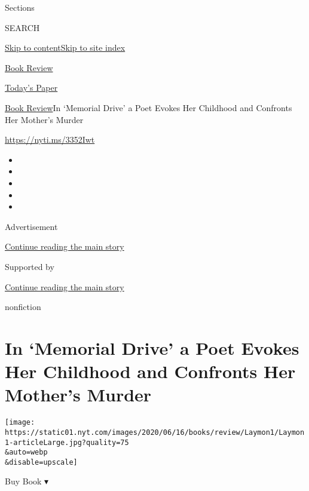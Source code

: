 Sections

SEARCH

\protect\hyperlink{site-content}{Skip to
content}\protect\hyperlink{site-index}{Skip to site index}

\href{https://www.nytimes.com/section/books/review}{Book Review}

\href{https://myaccount.nytimes.com/auth/login?response_type=cookie\&client_id=vi}{}

\href{https://www.nytimes.com/section/todayspaper}{Today's Paper}

\href{/section/books/review}{Book Review}\textbar{}In `Memorial Drive' a
Poet Evokes Her Childhood and Confronts Her Mother's Murder

\url{https://nyti.ms/3352Iwt}

\begin{itemize}
\item
\item
\item
\item
\item
\end{itemize}

Advertisement

\protect\hyperlink{after-top}{Continue reading the main story}

Supported by

\protect\hyperlink{after-sponsor}{Continue reading the main story}

nonfiction

\hypertarget{in-memorial-drive-a-poet-evokes-her-childhood-and-confronts-her-mothers-murder}{%
\section{In `Memorial Drive' a Poet Evokes Her Childhood and Confronts
Her Mother's
Murder}\label{in-memorial-drive-a-poet-evokes-her-childhood-and-confronts-her-mothers-murder}}

\texttt{[image: https://static01.nyt.com/images/2020/06/16/books/review/Laymon1/Laymon1-articleLarge.jpg?quality=75\\\&auto=webp\\\&disable=upscale]}

Buy Book ▾

